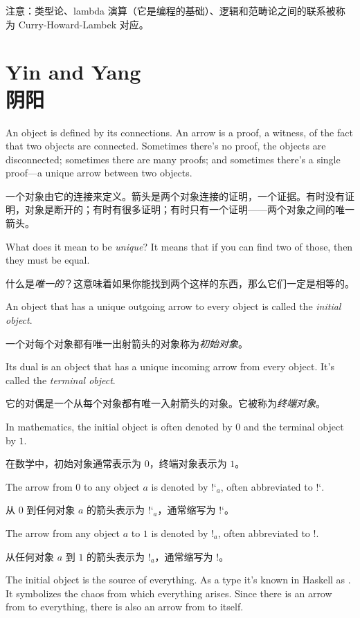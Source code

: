 \documentclass[DaoFP]{subfiles}
\begin{document}
 注意：类型论、lambda 演算（它是编程的基础）、逻辑和范畴论之间的联系被称为 Curry-Howard-Lambek 对应。

 \section{Yin and Yang\\阴阳}

 An object is defined by its connections. An arrow is a proof, a witness, of the fact that two objects are connected. Sometimes there's no proof, the objects are disconnected; sometimes there are many proofs; and sometimes there's a single proof---a unique arrow between two objects.

 一个对象由它的连接来定义。箭头是两个对象连接的证明，一个证据。有时没有证明，对象是断开的；有时有很多证明；有时只有一个证明——两个对象之间的唯一箭头。

 What does it mean to be \emph{unique}? It means that if you can find two of those, then they must be equal.

 什么是\emph{唯一的}？这意味着如果你能找到两个这样的东西，那么它们一定是相等的。

 An object that has a unique outgoing arrow to every object is called the \emph{initial object}.

 一个对每个对象都有唯一出射箭头的对象称为\emph{初始对象}。

 Its dual is an object that has a unique incoming arrow from every object. It's called the \emph{terminal object}.

 它的对偶是一个从每个对象都有唯一入射箭头的对象。它被称为\emph{终端对象}。

 In mathematics, the initial object is often denoted by $0$ and the terminal object by $1$.

 在数学中，初始对象通常表示为 $0$，终端对象表示为 $1$。

 The arrow from $0$ to any object $a$ is denoted by $\mbox{!`}_a$, often abbreviated to $\mbox{!`}$.

 从 $0$ 到任何对象 $a$ 的箭头表示为 $\mbox{!`}_a$，通常缩写为 $\mbox{!`}$。

 The arrow from any object $a$ to $1$ is denoted by $!_a$, often abbreviated to $!$.

 从任何对象 $a$ 到 $1$ 的箭头表示为 $!_a$，通常缩写为 $!$。

 The initial object is the source of everything. As a type it's known in Haskell as . It symbolizes the chaos from which everything arises. Since there is an arrow from  to everything, there is also an arrow from  to itself.
\end{document}

